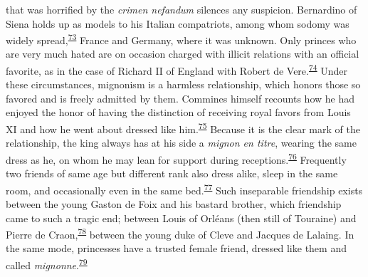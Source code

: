 that was horrified by the \emph{crimen nefandum} silences any suspicion.
Bernardino of Siena holds up as models to his Italian compatriots, among
whom sodomy was widely
spread,\textsuperscript{\protect\hypertarget{09_Chapter_Two__THE_CRAVING_FOR_A_M.xhtmlux5cux23id_1943}{\protect\hyperlink{23_NOTES.xhtmlux5cux23id_1944}{73}}}
France and Germany, where it was unknown. Only princes who are very much
hated are on occasion charged with illicit relations with an official
favorite, as in the case of Richard II of England with Robert de
Vere.\textsuperscript{\protect\hypertarget{09_Chapter_Two__THE_CRAVING_FOR_A_M.xhtmlux5cux23id_1941}{\protect\hyperlink{23_NOTES.xhtmlux5cux23id_1942}{74}}}
Under these circumstances, mignonism is a harmless relationship, which
honors those so favored and is freely admitted by them. Commines himself
recounts how he had enjoyed the honor of having the distinction of
receiving royal favors from Louis XI and how he went about dressed like
him.\textsuperscript{\protect\hypertarget{09_Chapter_Two__THE_CRAVING_FOR_A_M.xhtmlux5cux23id_1939}{\protect\hyperlink{23_NOTES.xhtmlux5cux23id_1940}{75}}}
Because it is the clear mark of the relationship, the king always has at
his side a \emph{mignon en titre}, wearing the same dress as he, on whom
he may lean for support during
receptions.\textsuperscript{\protect\hypertarget{09_Chapter_Two__THE_CRAVING_FOR_A_M.xhtmlux5cux23id_1937}{\protect\hyperlink{23_NOTES.xhtmlux5cux23id_1938}{76}}}
Frequently two friends of same age but different rank also dress alike,
sleep in the same room, and occasionally even in the same
bed.\textsuperscript{\protect\hypertarget{09_Chapter_Two__THE_CRAVING_FOR_A_M.xhtmlux5cux23id_1935}{\protect\hyperlink{23_NOTES.xhtmlux5cux23id_1936}{77}}}
Such inseparable friendship exists between the young Gaston de Foix and
his bastard brother, which friendship came to such a tragic end; between
Louis of Orléans (then still of Touraine) and Pierre de
Craon,\textsuperscript{\protect\hypertarget{09_Chapter_Two__THE_CRAVING_FOR_A_M.xhtmlux5cux23id_1933}{\protect\hyperlink{23_NOTES.xhtmlux5cux23id_1934}{78}}}
between the young duke of Cleve and Jacques de Lalaing. In the same
mode, princesses have a trusted female friend, dressed like them and
called
\emph{mignonne}.\textsuperscript{\protect\hypertarget{09_Chapter_Two__THE_CRAVING_FOR_A_M.xhtmlux5cux23id_1931}{\protect\hyperlink{23_NOTES.xhtmlux5cux23id_1932}{79}}}

